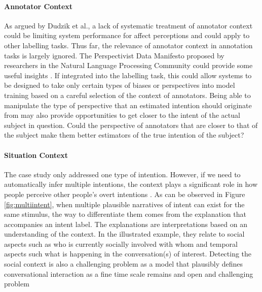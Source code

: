 \documentclass[manuscript,screen,review]{acmart}
\begin{document}
\paragraph {Annotator Context}
As argued by Dudzik et al., a lack of systematic treatment of annotator context could be limiting system performance for affect perceptions\cite{dudzik2019context} and could apply to other labelling tasks. Thus far, the relevance of annotator context in annotation tasks is largely ignored. The Perspectivist Data Manifesto proposed by researchers in the Natural Language Processing Community could provide some useful insights \cite{Cabitza2023}. If integrated into the labelling task, this could allow systems to be designed to take only certain types of biases or perspectives into model training based on a careful selection of the context of annotators. Being able to manipulate the type of perspective that an estimated intention should originate from may also provide opportunities to get closer to the intent of the actual subject in question. Could the perspective of annotators that are closer to that of the subject make them better estimators of the true intention of the subject?

\paragraph {Situation Context}
The case study only addressed one type of intention. However, if we need to automatically infer multiple intentions, the context plays a significant role in how people perceive other people's overt intentions \cite{Alhasan2023}. As can be observed in Figure \ref{fig:multiintent}, when multiple plausible narratives of intent can exist for the same stimulus, the way to differentiate them comes from the explanation that accompanies an intent label. The explanations are interpretations based on an understanding of the context. In the illustrated example, they relate to social aspects such as who is currently socially involved with whom and temporal aspects such what is happening in the conversation(s) of interest. Detecting the social context is also a challenging problem as a model that plausibly defines conversational interaction as a fine time scale remains and open and challenging problem \cite{raman2019towards,10.1109/FG52635.2021.9667061,tan2022conversation,10.1145/3462244.3479963}





\end{document}
